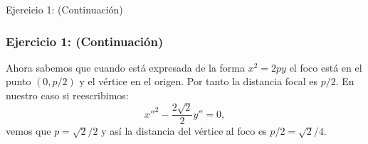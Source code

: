 \documentclass[xcolor={dvipsnames},aspectratio=169,10pt]{beamer}
\begin{document}
\begin{frame}{Ejercicio 1: (Continuación)}
  \frametitle{Ejercicio 1: (Continuación)}
    Ahora sabemos que cuando está expresada de la forma $x^2 = 2py$ el foco está en el punto $(0, p/2)$ y el vértice en el origen. Por tanto la distancia focal es $p/2$. En nuestro caso si reescribimos:
    \[x''^2 - \frac{2\sqrt{2}}{2}y'' = 0,\]
    vemos que $p = \sqrt{2}/2$ y así la distancia del vértice al foco es $p/2 = \sqrt{2}/4$.
\end{frame}


\end{document}

